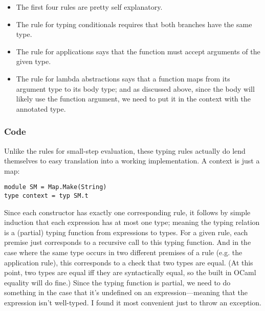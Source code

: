 \documentclass[pageno]{jpaper}
\begin{document}
{\begin{prooftree}
\end{prooftree}

\begin{prooftree}
\end{prooftree}

\begin{prooftree}
\end{prooftree}

\begin{itemize}
\item The first four rules are pretty self explanatory.
\item The rule for typing conditionals requires that both branches have the same type.
\item The rule for applications says that the function must accept arguments of the given type.
\item The rule for lambda abstractions says that a function maps from its argument type to its body type; and
as discussed above, since the body will likely use the function argument, we need to put it
in the context with the annotated type.
\end{itemize}

\subsubsection{Code}
Unlike the rules for small-step evaluation, these typing rules actually do lend themselves to
easy translation into a working implementation. A context is just a map:
\begin{lstlisting}
module SM = Map.Make(String)
type context = typ SM.t
\end{lstlisting}

Since each constructor has exactly one corresponding rule, it follows by simple induction that
each expression has at most one type; meaning the typing relation is a (partial) typing function from expressions
to types. For a given rule, each premise just corresponds to a recursive call to this typing
function. And in the case where the same type occurs in two different premises of a rule (e.g. the application rule), this corresponds to a check that two types are equal. (At this point, two types are equal iff they are
syntactically equal, so the built in OCaml equality will do fine.)
Since the typing function is partial, we need to do something in the case that it's undefined on
an expression---meaning that the expression isn't well-typed.  I found it most convenient just to throw an
exception.

}
\end{document}

